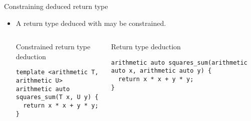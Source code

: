 \begin{frame}[t,fragile]{Constraining deduced return type}
\begin{itemize}
  \item A return type deduced with  may be constrained.

\begin{columns}[T]

\begin{block}{Constrained return type deduction}
\begin{lstlisting}
template <arithmetic T, arithmetic U>
arithmetic auto squares_sum(T x, U y) {
  return x * x + y * y;
}
\end{lstlisting}
\end{block}


\begin{block}{Return type deduction}
\begin{lstlisting}
arithmetic auto squares_sum(arithmetic auto x, arithmetic auto y) {
  return x * x + y * y;
}
\end{lstlisting}
\end{block}

\end{columns}
\end{itemize}
\end{frame}
